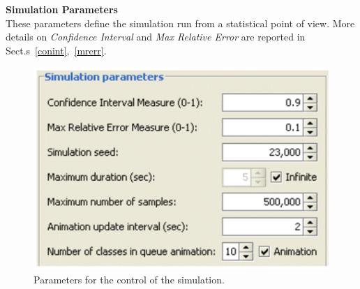 \noindent \textbf{Simulation Parameters}\\
These parameters define the simulation run from a statistical
point of view. More details on \emph{Confidence Interval} and \emph{Max
Relative
Error} are reported in Sect.s~\ref{conint},~\ref{mrerr}.\\
\begin{figure}[htb]
    \begin{center}
        \includegraphics[scale=.5]{img/jsimg/9.4.eps}
    \end{center}
    \caption{Parameters for the control of the simulation.}
    \label{fig:simcontr}
\end{figure}
